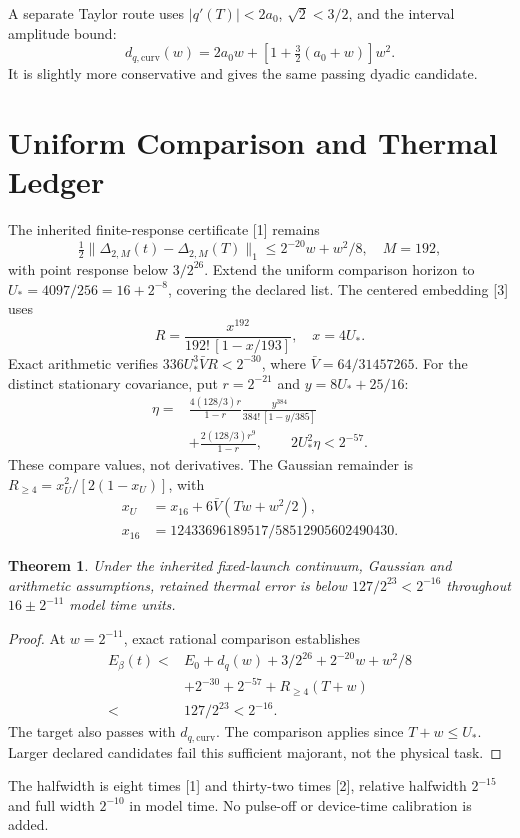 \documentclass[a4paper,journal]{IEEEtran}
\newtheorem{theorem}{Theorem}
\begin{document}
A separate Taylor route uses $|q'(T)|<2a_0$, $\sqrt2<3/2$, and the interval amplitude bound:
\begin{equation}
 d_{q,\mathrm{curv}}(w)=2a_0w+[1+\tfrac32(a_0+w)]w^2.
\end{equation}
It is slightly more conservative and gives the same passing dyadic candidate.
\section{Uniform Comparison and Thermal Ledger}
The inherited finite-response certificate [1] remains
\begin{equation}
 \tfrac12\|\Delta_{2,M}(t)-\Delta_{2,M}(T)\|_1
 \le2^{-20}w+w^2/8,\quad M=192,
\end{equation}
with point response below $3/2^{26}$. Extend the uniform comparison horizon to $U_*=4097/256=16+2^{-8}$, covering the declared list. The centered embedding [3] uses
\begin{equation}
 R=\frac{x^{192}}{192!\,[1-x/193]},\quad x=4U_*.
\end{equation}
Exact arithmetic verifies $336U_*^3\bar V R<2^{-30}$, where $\bar V=64/31457265$. For the distinct stationary covariance, put $r=2^{-21}$ and $y=8U_*+25/16$:
\begin{align}
 \eta={}&\frac{4(128/3)r}{1-r}
 \frac{y^{384}}{384!\,[1-y/385]}\\
 &+\frac{2(128/3)r^9}{1-r},\qquad2U_*^2\eta<2^{-57}.
\end{align}
These compare values, not derivatives. The Gaussian remainder is $R_{\ge4}=x_U^2/[2(1-x_U)]$, with
\begin{align}
 x_U&=x_{16}+6\bar V(Tw+w^2/2),\\
 x_{16}&=12433696189517/58512905602490430.
\end{align}
\begin{theorem}
Under the inherited fixed-launch continuum, Gaussian and arithmetic assumptions, retained thermal error is below $127/2^{23}<2^{-16}$ throughout $16\pm2^{-11}$ model time units.
\end{theorem}
\begin{proof}
At $w=2^{-11}$, exact rational comparison establishes
\begin{align}
 E_\beta(t)<{}&E_0+d_q(w)+3/2^{26}+2^{-20}w+w^2/8\\
 &+2^{-30}+2^{-57}+R_{\ge4}(T+w)\\
 <{}&127/2^{23}<2^{-16}.
\end{align}
The target also passes with $d_{q,\mathrm{curv}}$. The comparison applies since $T+w\le U_*$. Larger declared candidates fail this sufficient majorant, not the physical task.
\end{proof}
The halfwidth is eight times [1] and thirty-two times [2], relative halfwidth $2^{-15}$ and full width $2^{-10}$ in model time. No pulse-off or device-time calibration is added.
\end{document}
